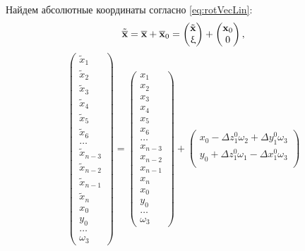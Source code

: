 Найдем абсолютные координаты согласно \eqref{eq:rotVecLin}:
\begin{equation}
	\tilde{\overline{\mathbf{x}}} = \overline{\mathbf{x}} + \overline{\mathbf{x}}_0 =
	\begin{pmatrix} \tilde{\mathbf{x}} \\ \upxi \end{pmatrix}
	+
	\begin{pmatrix} \mathbf{x}_0 \\ 0 \end{pmatrix}, \label{AbsoluteCoord}
\end{equation}
\begin{equation*}
	\begin{pmatrix}
		\tilde{x}_1 \\
		\tilde{x}_2 \\
		\tilde{x}_3 \\
		\tilde{x}_4 \\
		\tilde{x}_5 \\
		\tilde{x}_6 \\
		\hdots \\
		\tilde{x}_{n-3} \\
		\tilde{x}_{n-2} \\
		\tilde{x}_{n-1} \\
		\tilde{x}_{n} \\
		x_0 \\
		y_0 \\
		\hdots \\
		\omega_3
	\end{pmatrix} =
	\begin{pmatrix}
		x_1 \\
		x_2 \\
		x_3 \\
		x_4 \\
		x_5 \\
		x_6 \\
		\hdots \\
		x_{n-3} \\
		x_{n-2} \\
		x_{n-1} \\
		x_{n} \\
		x_0 \\
		y_0 \\
		\hdots \\
		\omega_3
	\end{pmatrix} +
	\begin{pmatrix}
		x_0 - \Delta z_1^0 \omega_2 + \Delta y_1^0 \omega_3 \\
		y_0 + \Delta z_1^0 \omega_1 - \Delta x_1^0 \omega_3 \\

\end{pmatrix}
\end{equation*}
